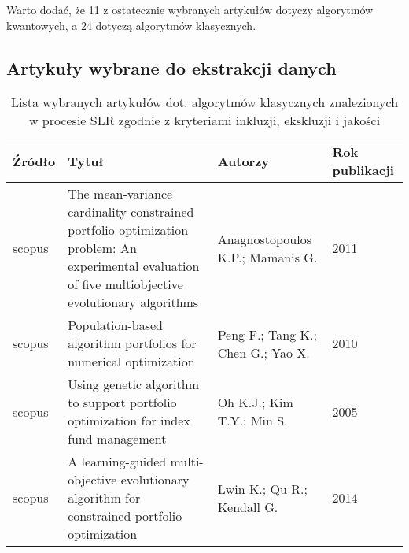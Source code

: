 \documentclass[polish,envcountsect,10pt]{article}
\begin{document}
Warto dodać, że 11 z ostatecznie wybranych artykułów dotyczy algorytmów kwantowych, a 24 dotyczą algorytmów klasycznych.

\subsection{Artykuły wybrane do ekstrakcji danych}

\begin{table}[H]
	\caption{Lista wybranych artykułów dot. algorytmów klasycznych znalezionych w procesie SLR zgodnie z kryteriami inkluzji, ekskluzji i jakości}
	\centering
	\begin{tabular}{|p{2cm}|p{6cm}|p{3cm}|p{2cm}|}
		\hline
		Źródło & Tytuł                                                                                                                                               & Autorzy                           & Rok publikacji \\
		\hline
		scopus & The mean-variance cardinality constrained portfolio optimization problem: An experimental evaluation of five multiobjective evolutionary algorithms & Anagnostopoulos K.P.; Mamanis G.  & 2011           \\
		\hline
		scopus & Population-based algorithm portfolios for numerical optimization                                                                                    & Peng F.; Tang K.; Chen G.; Yao X. & 2010           \\
		\hline
		scopus & Using genetic algorithm to support portfolio optimization for index fund management                                                                 & Oh K.J.; Kim T.Y.; Min S.         & 2005           \\
		\hline
		scopus & A learning-guided multi-objective evolutionary algorithm for constrained portfolio optimization                                                     & Lwin K.; Qu R.; Kendall G.        & 2014           \\
		\hline
	\end{tabular}
\end{table}
\end{document}

